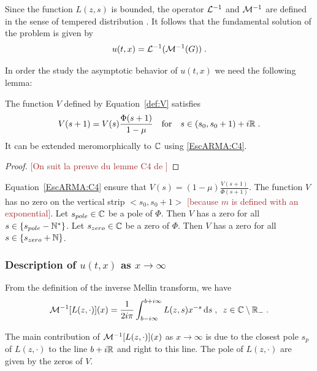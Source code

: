 \documentclass[11pt]{amsart}
\newcommand{\diff}{\,\mathrm{d}}
\newcommand{\ndr}[1]{\textcolor{brown}{[#1]}}
\begin{document}
Since the function $L(z,s)$ is bounded, the operator $\mathcal{L}^{-1}$ and $ \mathcal{M}^{-1}$ are defined in the sense of tempered distribution \cite{misra1986transform}. It follows that the fundamental solution of the problem is given by 
    \begin{equation}
        u(t,x) = \mathcal{L}^{-1} (\mathcal{M}^{-1} (G))
        \; .
    \end{equation}
    
In order the study the asymptotic behavior of $u(t,x)$ we need the following lemma: 
\begin{lemma}The function $V$ defined by Equation~\eqref{def:V} satisfies
    \begin{equation}
        V(s+1) = V(s)\frac{\Phi(s+1)}{1-\mu}
        \quad \text{for} \quad
        s \in (s_0, s_0+1) + i\mathbb{R}
        \; .
        \label{EscARMA:C4}
    \end{equation}
It can be extended meromorphically to $\mathbb{C}$ using \eqref{EscARMA:C4}.
\end{lemma}
\begin{proof}
\ndr{On suit la preuve du lemme C4 de \cite{escobedo2007fundamental}}
\end{proof}

\begin{remark}
    Equation~\eqref{EscARMA:C4} ensure that $V(s) = (1-\mu)\frac{V(s+1)}{\Phi(s+1)}$. 
    The function $V$ has no zero on the vertical strip $<s_0, s_0+1>$ \ndr{because $m$ is defined with an exponential}. Let $s_{pole} \in \mathbb{C}$ be a pole of $\Phi$. Then $V$ has a zero for all $s \in \{s_{pole} - \mathbb{N}^* \}$.
    Let $s_{zero} \in \mathbb{C}$ be a zero of $\Phi$. Then $V$ has a zero for all 
    $s \in \{s_{zero} + \mathbb{N}\}$. 
\end{remark}

    
\subsubsection{Description of $u(t,x)$ as $x \to \infty$}\text{\\}

From the definition of the inverse Mellin transform, we have
\begin{equation}
    \Mcal^{-1}[L(z,\cdot)](x) = \frac{1}{2i\pi} \int_{b-i\infty}^{b+i\infty} L(z,s)x^{-s}\diff s
    \eqsepv
    z \in \CC \setminus \RR_-
    \eqfinp
\end{equation}

The main contribution of $\mathcal{M}^{-1}[L(z,\cdot)](x)$ as $x \to \infty$ is due to the closest pole $s_p$ of $L(z,\cdot)$ to the line $b+i\mathbb{R}$ and right to this line. The pole of $L(z,\cdot)$ are given by the zeros of $V$. 
\end{document}
